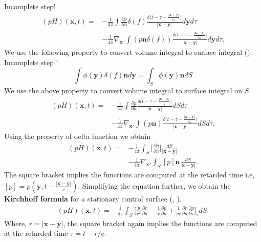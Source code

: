 \documentclass[a4paper]{article}
\begin{document}
Incomplete step!
\begin{equation}
	\begin{split}
		(pH)(\mathbf{x}, t) = &-\frac{1}{4\pi}\int {\frac{\partial p}{\partial n}\delta(f) \frac{\delta \Big(t - \tau - \frac{|\mathbf{x} - \mathbf{y}|}{c_{0}}\Big)}{|\mathbf{x} - \mathbf{y}|}} d\mathbf{y}d\tau \\
		&-\frac{1}{4\pi}\nabla_{\mathbf{x}}.\int (p \mathbf{n} \delta(f)){\frac{\delta \Big(t - \tau - \frac{|\mathbf{x} - \mathbf{y}|}{c_{0}}\Big)}{|\mathbf{x} - \mathbf{y}|}} d\mathbf{y}d\tau.
	\end{split}
\end{equation}
We use the following property to convert volume integral to surface integral (\cite{FARASSAT1988451}).
Incomplete step !
\begin{equation}\label{volume surface}
	\int \phi (\mathbf{y}) \delta (f) \mathbf{n} d\mathbf{y} = \int_{S} \phi (\mathbf{y}) \mathbf{n} dS
\end{equation}
We use the above property to convert volume integral to surface integral on $S$
\begin{equation}
	\begin{split}
		(pH)(\mathbf{x}, t) = &-\frac{1}{4\pi}\int {\frac{\partial p}{\partial n} \frac{\delta \Big(t - \tau - \frac{|\mathbf{x} - \mathbf{y}|}{c_{0}}\Big)}{|\mathbf{x} - \mathbf{y}|}} dSd\tau \\
		&-\frac{1}{4\pi}\nabla_{\mathbf{x}}.\int (p \mathbf{n} ){\frac{\delta \Big(t - \tau - \frac{|\mathbf{x} - \mathbf{y}|}{c_{0}}\Big)}{|\mathbf{x} - \mathbf{y}|}} dSd\tau.
	\end{split}
\end{equation}
Using the property of delta function we obtain
\begin{equation}
	\begin{split}
		(pH)(\mathbf{x}, t) = &-\frac{1}{4\pi}\int_{S} { \Big[\frac{\partial p}{\partial n}\Big] \frac{dS}{|\mathbf{x} - \mathbf{y}|}}  \\
		&-\frac{1}{4\pi}\nabla_{\mathbf{x}}.\int_{S} [p]\mathbf{n}{\frac{dS}{|\mathbf{x} - \mathbf{y}|}} .
	\end{split}
\end{equation}
The square bracket implies the functions are computed at the retarded time i.e, $[p] = p(\mathbf{y}, t - \frac{|\mathbf{x} - \mathbf{y}|}{c})$. Simplifying the equation further, we obtain the \textbf{Kirchhoff formula} for a stationary control surface (\cite{FARASSAT1988451}, \cite{jamaluddin}).
\begin{equation}\label{Kirchhoff Integral}
	\begin{split}
		(pH)(\mathbf{x}, t) = -\frac{1}{4\pi}\int_{S}\Big[  \frac{p}{r^{2}}\frac{\partial r}{\partial n} - \frac{1}{r}\frac{\partial p}{\partial n} + \frac{1}{c r}\frac{\partial r}{\partial n}\frac{\partial p}{\partial \tau} \Big]_{\tau} dS.
	\end{split}
\end{equation}
Where, $r = |\mathbf{x} - \mathbf{y}|$, the square bracket again implies the functions are computed at the retarded time $\tau = t - r/c$.
\end{document}
